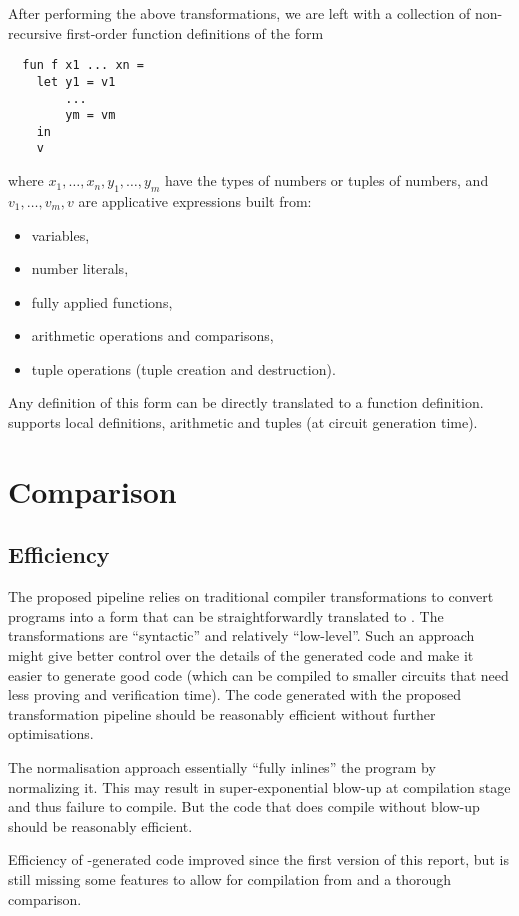 \documentclass[
    9pt,            %
    techreport,        %
    affiltop,       %
]{art}
\begin{document}
After performing the above transformations, we are left with a
collection of non-recursive first-order function definitions of the
form
\begin{verbatim}
  fun f x1 ... xn =
    let y1 = v1
        ...
        ym = vm
    in
    v
\end{verbatim}
where $x_1,\ldots,x_n,y_1,\ldots,y_m$ have the types of numbers or
tuples of numbers, and $v_1,\ldots,v_m,v$ are applicative
expressions built from:
\begin{itemize}
\item variables,
\item number literals,
\item fully applied functions,
\item arithmetic operations and comparisons,
\item tuple operations (tuple creation and destruction).
\end{itemize}
Any definition of this form can be directly translated to a \VampIR{}
function definition. \VampIR{} supports local definitions, arithmetic and
tuples (at circuit generation time).

\section{Comparison}\label{sec_comparison}

\subsection{Efficiency}

The proposed pipeline relies on traditional compiler transformations
to convert \Juvix{} programs into a form that can be straightforwardly
translated to \VampIR{}. The transformations are ``syntactic'' and
relatively ``low-level''. Such an approach might give better control
over the details of the generated \VampIR{} code and make it easier to
generate good \VampIR{} code (which can be compiled to
smaller circuits that need less proving and verification time). The code generated with the proposed
transformation pipeline should be reasonably efficient without further
optimisations.

The normalisation approach essentially ``fully inlines'' the program
by normalizing it. This may result in super-exponential blow-up at
compilation stage and thus failure to compile. But the code that does
compile without blow-up should be reasonably efficient.

Efficiency of \Geb{}-generated code improved since the first version of this report, but
\Geb{} is still missing some features to allow for compilation from \Juvix{} and a thorough comparison.
\end{document}
